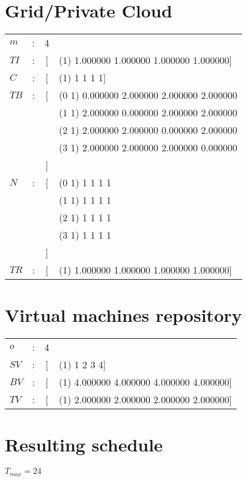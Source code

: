 \section{Grid/Private Cloud}
    \begin{tabular}{l c c l}
        $m$  & : & 4 & \\       
        $TI$ & : & [ & (1) 1.000000 1.000000 1.000000 1.000000]\\
        $C$  & : & [ & (1) 1 1 1 1]\\

        $TB$ & : & [ & (0 1) 0.000000 2.000000 2.000000 2.000000 \\
             &   &   & (1 1) 2.000000 0.000000 2.000000 2.000000\\
             &   &   & (2 1) 2.000000 2.000000 0.000000 2.000000\\
             &   &   & (3 1) 2.000000 2.000000 2.000000 0.000000\\
             &   & ] & \\
        $N$  & : & [ & (0 1) 1 1 1 1\\
             &   &   & (1 1) 1 1 1 1\\
             &   &   & (2 1) 1 1 1 1\\
             &   &   & (3 1) 1 1 1 1\\
             &   & ] & \\
        $TR$ & : & [ & (1) 1.000000 1.000000 1.000000 1.000000]\\
    \end{tabular}



\section{Virtual machines repository}

    \begin{tabular}{l c c l}
        $o$  & : & 4 & \\
        $SV$ & : & [ & (1) 1 2 3 4]\\
        $BV$ & : & [ & (1) 4.000000 4.000000 4.000000 4.000000]\\
        $TV$ & : & [ & (1) 2.000000 2.000000 2.000000 2.000000]\\
    \end{tabular}



\section{Resulting schedule}

$T_{max}=24$